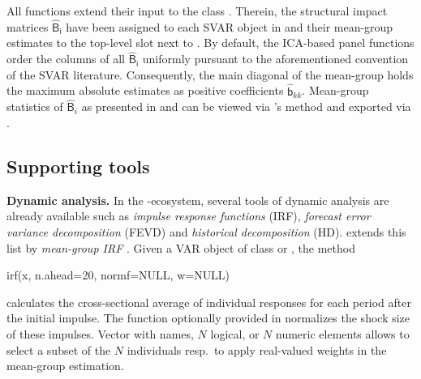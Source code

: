 All \mbox{} functions extend their  input to the class . Therein, the structural impact matrices $ \mathsf{\widehat{B}_i} $ have been assigned to each SVAR object in  and their mean-group estimates to the top-level slot  next to . By default, the ICA-based panel functions order the columns of all $ \mathsf{\widehat{B}_i} $ uniformly pursuant to the aforementioned convention of the SVAR literature. Consequently, the main diagonal of the mean-group  holds the maximum absolute estimates as positive coefficients $ \mathsf{\widehat{b}}_{kk} $. Mean-group statistics of $ \widehat{\mathsf{B}}_i $ as presented in \citet{BernothHerwartz2021} and \citet{Herwartz2017} can be viewed via 's  method and exported via .


\subsection{Supporting tools} \label{sec:supp}
\textbf{Dynamic analysis.} In the -ecosystem, several tools of dynamic analysis are already available such as \textit{impulse response functions} (IRF), \textit{forecast error variance decomposition} (FEVD) and \textit{historical decomposition} (HD).  extends this list by \textit{mean-group IRF} \citep[p.~627]{GambacortaEtAl2014}. Given a VAR object  of class  or , the method 
\begin{CodeChunk}
\begin{CodeInput}
irf(x, n.ahead=20, normf=NULL, w=NULL)
\end{CodeInput}
\end{CodeChunk}
calculates the cross-sectional average of individual responses for each period after the initial impulse. The function optionally provided in  normalizes the shock size of these impulses. Vector  with names, $ N $ logical, or $ N $ numeric elements allows to select a subset of the $ N $ individuals resp.~to apply real-valued weights in the mean-group estimation.


